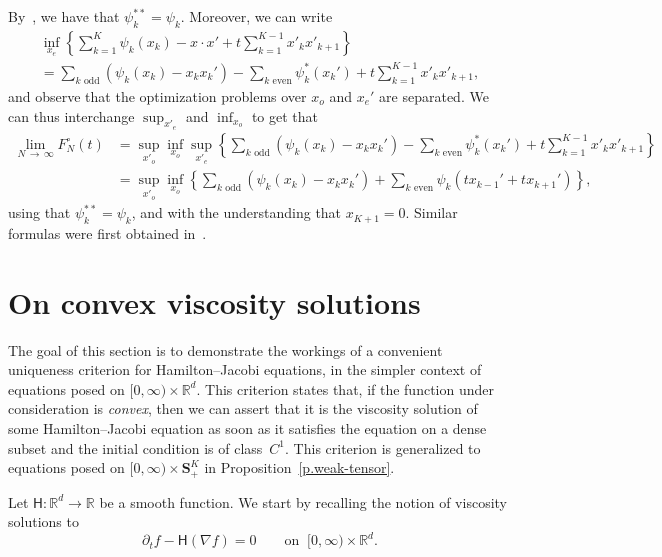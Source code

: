 \documentclass[10pt]{amsart}
\theoremstyle{definition}\newtheorem{defi}[theo]{Definition}\newtheorem{rema}[theo]{Remark}\newtheorem{exam}[theo]{Example}\newtheorem{exem}[theo]{Example}\newtheorem{nota}[theo]{Notation}
\newcommand{\R}{\mathbb{R}}
\renewcommand{\S}{\mathbf{S}}
\newcommand{\Ll}{\left}
\newcommand{\Rr}{\right}
\newcommand{\dr}{\partial}
\newcommand{\msf}{\mathsf}
\begin{document}
By~\cite[Theorem~12.4]{rockafellar1970convex}, we have that $\psi_k^{**} = \psi_k$. Moreover, we can write
\begin{multline*}
\inf_{x_e} \Ll\{ \sum_{k = 1}^K \psi_k(x_k) - x \cdot x' + t \sum_{k = 1}^{K-1} x'_k x'_{k+1}\Rr\} \\
= \sum_{k \text{ odd}} \Ll(\psi_k(x_k) -x_k x_k'\Rr) - \sum_{k \text{ even}} \psi^*_k(x_k') + t \sum_{k = 1}^{K-1} x'_k x'_{k+1},
\end{multline*}
and observe that the optimization problems over $x_o$ and $x_e'$ are separated. We can thus interchange $\sup_{x'_e}$ and $\inf_{x_o}$ to get that
\begin{align*}
\lim_{N\,\to\,\infty} F_N^\circ(t) & = \sup_{x'_o} \inf_{x_o} \sup_{x'_e} \Ll\{ \sum_{k \text{ odd}} \Ll(\psi_k(x_k) -x_k x_k'\Rr) - \sum_{k \text{ even}} \psi_k^*\Ll(x_k'\Rr) + t \sum_{k = 1}^{K-1} x'_k x'_{k+1} \Rr\}
\\
& = \sup_{x'_o} \inf_{x_o} \Ll\{\sum_{k \text{ odd}} \Ll(\psi_k(x_k)- x_k x_k'\Rr) + \sum_{k \text{ even}} \psi_k\Ll(t x_{k-1}' + t x_{k+1}'\Rr)\Rr\},
\end{align*}
using that $\psi_k^{**} = \psi_k$, and with the understanding that $x_{K+1} = 0$. Similar formulas were first obtained in~\cite{accm}.



\appendix

\section{On convex viscosity solutions}\label{a.vis}

The goal of this section is to demonstrate the workings of a convenient uniqueness criterion for Hamilton--Jacobi equations, in the simpler context of equations posed on $[0,\infty) \times \R^d$. This criterion states that, if the function under consideration is \emph{convex}, then we can assert that it is the viscosity solution of some Hamilton--Jacobi equation as soon as it satisfies the equation on a dense subset and the initial condition is of class~$C^1$. This criterion is generalized to equations posed on $[0,\infty) \times \S^K_+$ in Proposition~\ref{p.weak-tensor}.


Let $\msf H: \R^d \to \R$ be a smooth function. We start by recalling the notion of viscosity solutions to
\begin{equation}\label{e.hj}
\dr_t f - \msf H(\nabla f) = 0 \qquad \text{on } \ [0,\infty) \times \R^d.
\end{equation}
\end{document}
